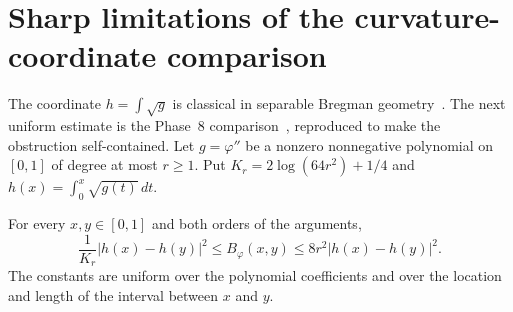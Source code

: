 \section{Sharp limitations of the curvature-coordinate comparison}
\label{sec:coordinate}
The coordinate $h=\int\sqrt g$ is classical in separable Bregman
geometry~\cite{gomes,gzyl}. The next uniform estimate is the Phase~8
comparison~\cite{huang8}, reproduced to make the obstruction self-contained.
Let $g=\varphi''$ be a nonzero nonnegative polynomial on $[0,1]$
of degree at most $r\ge1$. Put $K_r=2\log(64r^2)+1/4$ and
$h(x)=\int_0^x\sqrt{g(t)}\,dt$.

\begin{lemma}
\label{lem:poly-h-new}
For every $x,y\in[0,1]$ and both orders of the arguments,
\begin{equation}
 \frac{1}{K_r}|h(x)-h(y)|^2
 \le B_\varphi(x,y)
 \le 8r^2|h(x)-h(y)|^2.
 \label{eq:poly-h-new}
\end{equation}
The constants are uniform over the polynomial coefficients and over the
location and length of the interval between $x$ and $y$.
\end{lemma}

